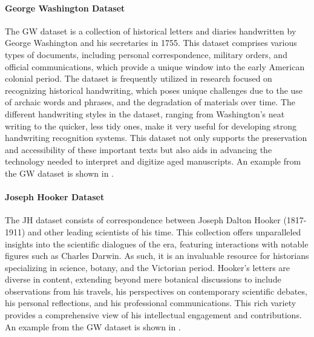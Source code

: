 \paragraph*{George Washington Dataset}
\label{par:3_george_washington_dataset}
The GW dataset is a collection of historical letters and diaries handwritten by George Washington and his secretaries in 1755. This dataset comprises various types of documents, including personal correspondence, military orders, and official communications, which provide a unique window into the early American colonial period. The dataset is frequently utilized in research focused on recognizing historical handwriting, which poses unique challenges due to the use of archaic words and phrases, and the degradation of materials over time. The different handwriting styles in the dataset, ranging from Washington's neat writing to the quicker, less tidy ones, make it very useful for developing strong handwriting recognition systems. This dataset not only supports the preservation and accessibility of these important texts but also aids in advancing the technology needed to interpret and digitize aged manuscripts. An example from the GW dataset is shown in .


\paragraph*{Joseph Hooker Dataset}
\label{par:3_joseph_hooker_dataset}
The JH dataset consists of correspondence between Joseph Dalton Hooker (1817-1911) and other leading scientists of his time. This collection offers unparalleled insights into the scientific dialogues of the era, featuring interactions with notable figures such as Charles Darwin. As such, it is an invaluable resource for historians specializing in science, botany, and the Victorian period. Hooker’s letters are diverse in content, extending beyond mere botanical discussions to include observations from his travels, his perspectives on contemporary scientific debates, his personal reflections, and his professional communications. This rich variety provides a comprehensive view of his intellectual engagement and contributions. An example from the GW dataset is shown in .


